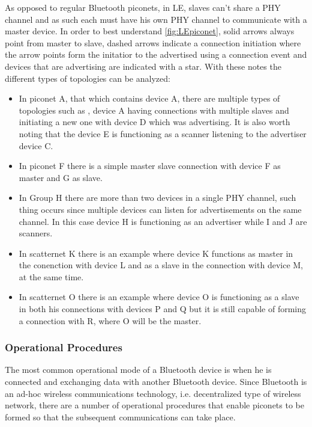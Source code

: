As opposed to regular Bluetooth piconets, in \ac{LE}, slaves can't share a \ac{PHY} channel and as such each must have his own \ac{PHY} channel to communicate with a master device. In order to best understand \ref{fig:LEpiconet}, solid arrows always point from master to slave, dashed arrows indicate a connection initiation where the arrow points form the initatior to the advertised using a connection event and devices that are advertising are indicated with a star. With these notes the different types of topologies can be analyzed:

\begin{itemize}
\item In piconet A, that which contains device A, there are multiple types of topologies such as , device A having connections with multiple slaves and initiating a new one with device D which was advertising. It is also worth noting that the device E is functioning as a scanner listening to the advertiser device C.

\item In piconet F there is a simple master slave connection with device F as master and G as slave.

\item In Group H there are more than two devices in a single \ac{PHY} channel, such thing occurs since multiple devices can listen for advertisements on the same channel. In this case device H is functioning as an advertiser while I and J are scanners.

\item In scatternet K there is an example where device K functions as master in the conenction with device L and as a slave in the connection with device M, at the same time.

\item In scatternet O there is an example where device O is functioning as a slave in both his connections with devices P and Q but it is still capable of forming a connection with R, where O will be the master.
\end{itemize}

\subsubsection{Operational Procedures}
\label{subsec:Operational}

The most common operational mode of a Bluetooth device is when he is connected and exchanging data with another Bluetooth device. Since Bluetooth is an ad-hoc wireless communications technology, i.e. decentralized type of wireless network, there are a number of operational procedures that enable piconets to be formed so that the subsequent communications can take place.

